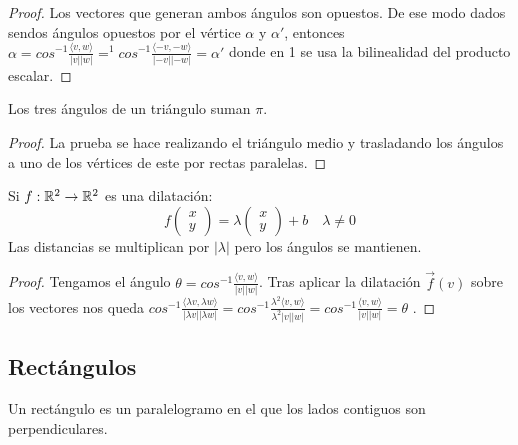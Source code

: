\begin{proof}
	Los vectores que generan ambos ángulos son opuestos. De ese modo dados sendos ángulos opuestos por el vértice $\alpha$ y $\alpha'$, entonces $\alpha= cos^{-1} \frac{\langle  v,w \rangle }{|v||w|} =^1  cos^{-1} \frac{\langle  -v,-w \rangle }{|-v||-w|}  = \alpha'$ donde en 1 se usa la bilinealidad del producto escalar.
\end{proof}


\begin{nth}
  Los tres ángulos de un triángulo suman $\pi$.
\end{nth}
\begin{proof}
  La prueba se hace realizando el triángulo medio y trasladando los ángulos a uno de los vértices de este por rectas paralelas.
\end{proof}

\begin{nprop}
  Si $f:\mathbb{R}^2 \to \mathbb{R}^2$ es una dilatación:
  \[
    f \begin{pmatrix}
      x\\
      y
    \end{pmatrix} = \lambda\begin{pmatrix}
      x\\
      y
    \end{pmatrix} + b \quad \lambda \ne 0
  \]
  Las distancias se multiplican por $|\lambda|$ pero los ángulos se mantienen.
\end{nprop}

\begin{proof}
	 Tengamos el ángulo $\theta=cos^{-1} \frac{\langle  v,w \rangle }{|v||w|} $. Tras aplicar la dilatación $ \vec f (v)$ sobre los vectores nos queda $cos^{-1} \frac{\langle  \lambda v,\lambda w \rangle }{|\lambda v||\lambda w|} = cos^{-1} \frac{\lambda^2 \langle  v,w \rangle }{\lambda^2 |v|| w|} = cos^{-1} \frac{ \langle  v,w \rangle }{ |v|| w|} =  \theta$ .
\end{proof}




\subsection{Rectángulos}
\begin{ndef}
  Un rectángulo es un paralelogramo en el que los lados contiguos son perpendiculares.
\end{ndef}


